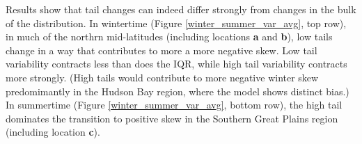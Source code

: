 \documentclass{ametsoc}
\begin{document}
Results  show that tail changes can indeed differ strongly from changes in the bulk of the distribution.  In wintertime (Figure \ref{winter_summer_var_avg}, top row), in much of the northrn mid-latitudes (including locations \textbf{a} and \textbf{b}), low tails change in a way that contributes to more a more negative skew. Low tail variability contracts less than does the IQR, while high tail variability contracts more strongly. (High tails would contribute to more negative winter skew predomimantly in the Hudson Bay region, where the model shows distinct bias.) In summertime (Figure \ref{winter_summer_var_avg}, bottom row), the high tail dominates the transition to positive skew in the Southern Great Plains region (including location \textbf{c}).

\end{document}
